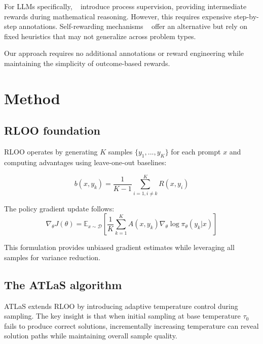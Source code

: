 \documentclass{article}
\begin{document}
For LLMs specifically, ~\cite{lightman2023let} introduce process supervision, providing intermediate rewards during mathematical reasoning. However, this requires expensive step-by-step annotations. Self-rewarding mechanisms ~\cite{chen2024self} offer an alternative but rely on fixed heuristics that may not generalize across problem types.

Our approach requires no additional annotations or reward engineering while maintaining the simplicity of outcome-based rewards.

\section{Method}

\subsection{RLOO foundation}

RLOO operates by generating $K$ samples $\{y_1, ..., y_K\}$ for each prompt $x$ and computing advantages using leave-one-out baselines:

\begin{equation}
b(x, y_k) = \frac{1}{K-1}\sum_{i=1, i \neq k}^{K} R(x, y_i)
\end{equation}

The policy gradient update follows:
\begin{equation}
\label{eq:grad}
\nabla_\theta J(\theta) = \mathbb{E}_{x \sim \mathcal{D}} \left[\frac{1}{K}\sum_{k=1}^{K} A(x, y_k) \nabla_\theta \log \pi_\theta(y_k|x)\right]
\end{equation}

This formulation provides unbiased gradient estimates while leveraging all samples for variance reduction.

\subsection{The ATLaS algorithm}

ATLaS extends RLOO by introducing adaptive temperature control during sampling. The key insight is that when initial sampling at base temperature $\tau_0$ fails to produce correct solutions, incrementally increasing temperature can reveal solution paths while maintaining overall sample quality.
\end{document}
